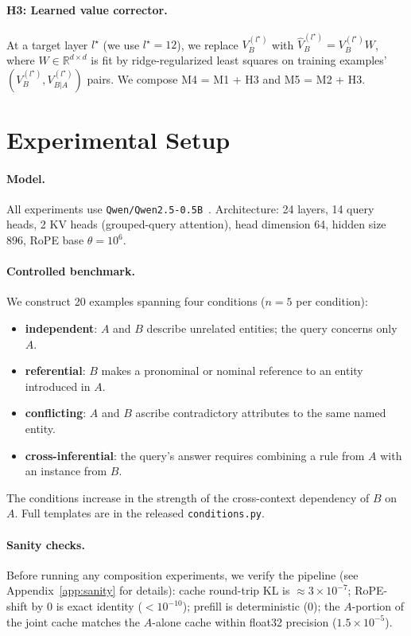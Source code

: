 \paragraph{H3: Learned value corrector.} At a target layer $l^\star$ (we use $l^\star = 12$), we replace $V^{(l^\star)}_B$ with $\hat V^{(l^\star)}_B = V^{(l^\star)}_B W$, where $W \in \mathbb{R}^{d \times d}$ is fit by ridge-regularized least squares on training examples' $(V^{(l^\star)}_B, V^{(l^\star)}_{B|A})$ pairs. We compose M4 = M1 + H3 and M5 = M2 + H3.

\section{Experimental Setup}

\paragraph{Model.} All experiments use \texttt{Qwen/Qwen2.5-0.5B}~\citep{qwen2025qwen25}. Architecture: 24 layers, 14 query heads, 2 KV heads (grouped-query attention), head dimension 64, hidden size 896, RoPE base $\theta = 10^6$.

\paragraph{Controlled benchmark.} We construct 20 examples spanning four conditions ($n=5$ per condition):
\begin{itemize}[leftmargin=*]
    \item \textbf{independent}: $A$ and $B$ describe unrelated entities; the query concerns only $A$.
    \item \textbf{referential}: $B$ makes a pronominal or nominal reference to an entity introduced in $A$.
    \item \textbf{conflicting}: $A$ and $B$ ascribe contradictory attributes to the same named entity.
    \item \textbf{cross-inferential}: the query's answer requires combining a rule from $A$ with an instance from $B$.
\end{itemize}
The conditions increase in the strength of the cross-context dependency of $B$ on $A$. Full templates are in the released \texttt{conditions.py}.

\paragraph{Sanity checks.} Before running any composition experiments, we verify the pipeline (see Appendix~\ref{app:sanity} for details): cache round-trip KL is $\approx 3\times10^{-7}$; RoPE-shift by 0 is exact identity ($< 10^{-10}$); prefill is deterministic ($0$); the $A$-portion of the joint cache matches the $A$-alone cache within float32 precision ($1.5\times10^{-5}$).

